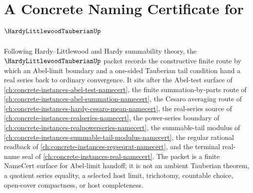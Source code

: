 \chapter{A Concrete Naming Certificate for $\HardyLittlewoodTauberianUp$}
\label{ch:concrete-instances-hardy-littlewood-tauberian-namecert}

Following Hardy--Littlewood and Hardy summability theory, the $\HardyLittlewoodTauberianUp$ packet records the constructive finite route by which an Abel-limit boundary and a one-sided Tauberian tail condition hand a real series back to ordinary convergence. It sits after the Abel-test surface of \autoref{ch:concrete-instances-abel-test-namecert}, the finite summation-by-parts route of \autoref{ch:concrete-instances-abel-summation-namecert}, the Cesaro averaging route of \autoref{ch:concrete-instances-hardy-cesaro-mean-namecert}, the real-series source of \autoref{ch:concrete-instances-realseries-namecert}, the power-series boundary of \autoref{ch:concrete-instances-realpowerseries-namecert}, the summable-tail modulus of \autoref{ch:concrete-instances-summable-tail-modulus-namecert}, the regular rational readback of \autoref{ch:concrete-instances-regseqrat-namecert}, and the terminal real-name seal of \autoref{ch:concrete-instances-real-namecert}. The packet is a finite NameCert surface for Abel-limit handoff; it is not an ambient Tauberian theorem, a quotient series equality, a selected host limit, trichotomy, countable choice, open-cover compactness, or host completeness.

